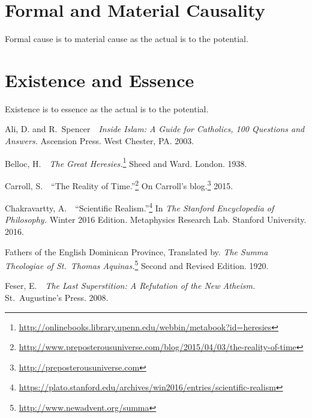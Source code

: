 \documentclass[twocolumn]{article}
\begin{document}
\section{Formal and Material Causality}

Formal cause is to material cause as the actual is to the potential.

\section{Existence and Essence}

Existence is to essence as the actual is to the potential.



\begin{thebibliography}{}

   \begin{small}

      Ali, D. and R.~Spencer\ \ {\it Inside Islam: A Guide for Catholics, 100
      Questions and Answers.}  Ascension Press.  West Chester, PA.  2003.

      Belloc, H.\ \ {\it The Great Heresies.}\footnote{%
         \url{http://onlinebooks.library.upenn.edu/webbin/metabook?id=heresies}
      }
      Sheed and Ward.  London.  1938.

      Carroll, S.\ \ ``The Reality of Time.''\footnote{%
         \url{http://www.preposterousuniverse.com/blog/2015/04/03/the-reality-of-time}%
      }
      On Carroll's blog.\footnote{\url{http://preposterousuniverse.com}}  2015.

      Chakravartty, A.\ \ ``Scientific Realism.''\footnote{%
         \url{https://plato.stanford.edu/archives/win2016/entries/scientific-realism}%
      }
      In {\it The Stanford Encyclopedia of Philosophy.}  Winter 2016 Edition.
      Metaphysics Research Lab.  Stanford University.  2016.

      Fathers of the English Dominican Province, Translated by. {\it The
      Summa Theologiae of St.~Thomas Aquinas.}\footnote{%
         \url{http://www.newadvent.org/summa}%
      }
      Second and Revised Edition.  1920.

      Feser, E.\ \ {\it The Last Superstition: A Refutation of the New
      Atheism.}  St.~Augustine's Press.  2008.


\end{small}
\end{thebibliography}
\end{document}
